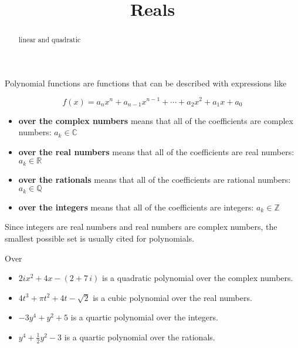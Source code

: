 \documentclass{ximera}
\title{Reals}
\begin{document}
\begin{abstract}
linear and quadratic
\end{abstract}
\maketitle




Polynomial functions are functions that can be described with expressions like

\[   f(x) = a_n x^n + a_{n-1} x^{n-1} + \cdots + a_2 x^2 + a_1 x + a_0     \]


\begin{itemize}
\item \textbf{over the complex numbers} means that all of the coefficients are complex numbers:   $a_k \in \mathbb{C}$
\item \textbf{over the real numbers} means that all of the coefficients are real numbers:   $a_k \in \mathbb{R}$
\item \textbf{over the rationals} means that all of the coefficients are rational numbers:   $a_k \in \mathbb{Q}$
\item \textbf{over the integers} means that all of the coefficients are integers:   $a_k \in \mathbb{Z}$
\end{itemize}



Since integers are real numbers and real numbers are complex numbers, the smallest possible set is usually cited for polynomials.



\begin{example}  Over


\begin{itemize}
\item $2i x^2 + 4 x - (2 + 7 \,i)$ is a quadratic polynomial over the complex numbers.

\item $4 t^3 + \pi t^2 + 4 t - \sqrt{2}$ is a cubic polynomial over the real numbers.

\item $-3 y^4 +  y^2 + 5$ is a quartic polynomial over the integers.

\item $ y^4 +  \frac{1}{2} y^2 - 3$ is a quartic polynomial over the rationals.
\end{itemize}




\end{example}
\end{document}
